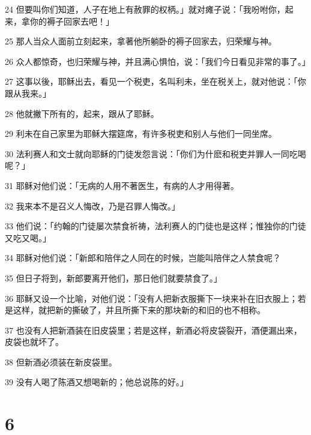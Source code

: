 \par 24 但要叫你们知道，人子在地上有赦罪的权柄。」就对瘫子说：「我吩咐你，起来，拿你的褥子回家去吧！」
\par 25 那人当众人面前立刻起来，拿著他所躺卧的褥子回家去，归荣耀与神。
\par 26 众人都惊奇，也归荣耀与神，并且满心惧怕，说：「我们今日看见非常的事了。」
\par 27 这事以後，耶稣出去，看见一个税吏，名叫利未，坐在税关上，就对他说：「你跟从我来。」
\par 28 他就撇下所有的，起来，跟从了耶稣。
\par 29 利未在自己家里为耶稣大摆筵席，有许多税吏和别人与他们一同坐席。
\par 30 法利赛人和文士就向耶稣的门徒发怨言说：「你们为什麽和税吏并罪人一同吃喝呢？」
\par 31 耶稣对他们说：「无病的人用不著医生，有病的人才用得著。
\par 32 我来本不是召义人悔改，乃是召罪人悔改。」
\par 33 他们说：「约翰的门徒屡次禁食祈祷，法利赛人的门徒也是这样；惟独你的门徒又吃又喝。」
\par 34 耶稣对他们说：「新郎和陪伴之人同在的时候，岂能叫陪伴之人禁食呢？
\par 35 但日子将到，新郎要离开他们，那日他们就要禁食了。」
\par 36 耶稣又设一个比喻，对他们说：「没有人把新衣服撕下一块来补在旧衣服上；若是这样，就把新的撕破了，并且所撕下来的那块新的和旧的也不相称。
\par 37 也没有人把新酒装在旧皮袋里；若是这样，新酒必将皮袋裂开，酒便漏出来，皮袋也就坏了。
\par 38 但新酒必须装在新皮袋里。
\par 39 没有人喝了陈酒又想喝新的；他总说陈的好。」

\chapter{6}

